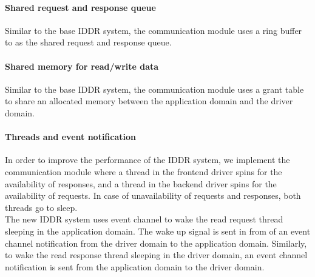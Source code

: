 \paragraph{Shared request and response queue}
Similar to the base IDDR system, the communication module uses a ring buffer to as the shared request and response queue. 

\paragraph{Shared memory for read/write data}
Similar to the base IDDR system, the communication module uses a grant table to share an allocated memory between the application domain and the driver domain. 

\paragraph{Threads and event notification}
In order to improve the performance of the IDDR system, we implement the communication module where a thread in the frontend driver spins for the availability of responses, and a thread in the backend driver spins for the availability of requests. In case of unavailability of requests and responses, both threads go to sleep. 
\\[3mm] 
The new IDDR system uses event channel to wake the read request thread sleeping in the application domain. The wake up signal is sent in from of an event channel notification from the driver domain to the application domain. Similarly, to wake the read response thread sleeping in the driver domain, an event channel notification is sent from the application domain to the driver domain.

